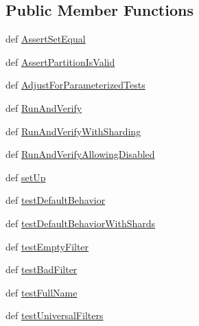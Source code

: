\subsection*{Public Member Functions}
\begin{DoxyCompactItemize}
\item 
def \hyperlink{classgtest__filter__unittest_1_1_g_test_filter_unit_test_af4fe5526fef3e2531eba0889abbb4b99}{Assert\-Set\-Equal}
\item 
def \hyperlink{classgtest__filter__unittest_1_1_g_test_filter_unit_test_a4807c3e43798cfca871b32c06d0822ef}{Assert\-Partition\-Is\-Valid}
\item 
def \hyperlink{classgtest__filter__unittest_1_1_g_test_filter_unit_test_a64459a94e952b09c079a8b81493d100b}{Adjust\-For\-Parameterized\-Tests}
\item 
def \hyperlink{classgtest__filter__unittest_1_1_g_test_filter_unit_test_ada5435d6a20621d01060eb1d838eee0c}{Run\-And\-Verify}
\item 
def \hyperlink{classgtest__filter__unittest_1_1_g_test_filter_unit_test_a6d37b9fb87437097a5d5794ec2ba522e}{Run\-And\-Verify\-With\-Sharding}
\item 
def \hyperlink{classgtest__filter__unittest_1_1_g_test_filter_unit_test_a1299abb0a89eefbb41c4458d2f907b46}{Run\-And\-Verify\-Allowing\-Disabled}
\item 
def \hyperlink{classgtest__filter__unittest_1_1_g_test_filter_unit_test_aed625a643f34ee594b9119e22a998ce5}{set\-Up}
\item 
def \hyperlink{classgtest__filter__unittest_1_1_g_test_filter_unit_test_a32bfae9fea425ac8f515014df9b2a687}{test\-Default\-Behavior}
\item 
def \hyperlink{classgtest__filter__unittest_1_1_g_test_filter_unit_test_ad39b17cf03829b3b62239ed25dbdbda0}{test\-Default\-Behavior\-With\-Shards}
\item 
def \hyperlink{classgtest__filter__unittest_1_1_g_test_filter_unit_test_ac5dc181d9aea70d04715a191eb4c1015}{test\-Empty\-Filter}
\item 
def \hyperlink{classgtest__filter__unittest_1_1_g_test_filter_unit_test_a55c6748122fc807c281db32cba39ea10}{test\-Bad\-Filter}
\item 
def \hyperlink{classgtest__filter__unittest_1_1_g_test_filter_unit_test_a645239a3b81225a42705680399ea31c3}{test\-Full\-Name}
\item 
def \hyperlink{classgtest__filter__unittest_1_1_g_test_filter_unit_test_acfbfe1aeb44db2721bc233925a2854d3}{test\-Universal\-Filters}
\item 

\end{DoxyCompactItemize}
